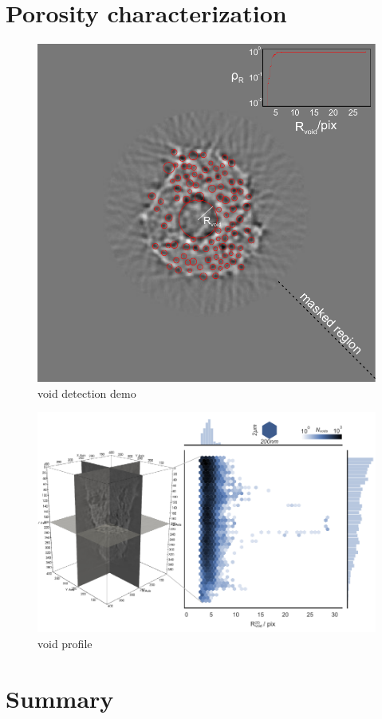 \documentclass[12pt]{scrartcl}
\newcommand{\myscale}{1}
\begin{document}

\section{Porosity characterization}\label{sec: porosity characterization}

\renewcommand{\myscale}{1.0}
\begin{figure}
\centering
\includegraphics[scale=\myscale]{voidDetectionDemo_mid}
\caption{
void detection demo
}\label{fig: void detection demo}
\end{figure}

\renewcommand{\myscale}{1.0}
\begin{figure}
\centering
\includegraphics[scale=\myscale]{void_profile}
\caption{
void profile
}\label{fig: void profile}
\end{figure}

\section{Summary}\label{sec: summary}
\end{document}
